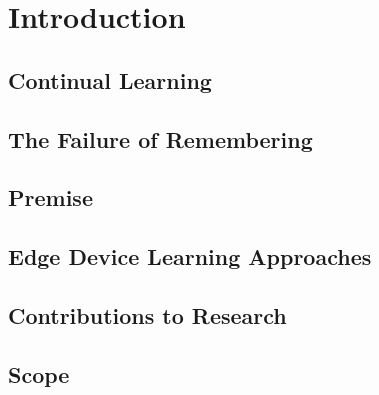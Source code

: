 
\chapter{Introduction}

\section{Continual Learning}

\section{The Failure of Remembering}

\section{Premise}

\section{Edge Device Learning Approaches}

\section{Contributions to Research}

\section{Scope}
